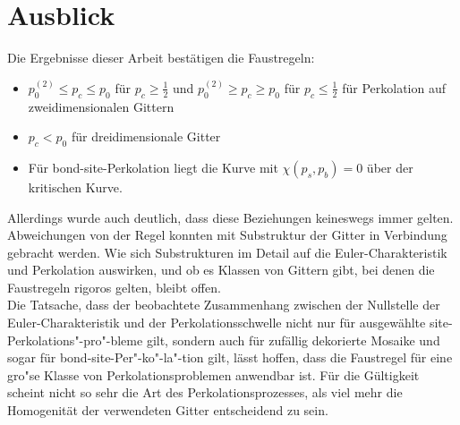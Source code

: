 \section*{Ausblick}
Die Ergebnisse dieser Arbeit best\"atigen die Faustregeln:
\begin{itemize}
\item  $p_0^{(2)}\leq p_c \leq p_0$ f\"ur $p_c\geq \frac{1}{2}$ und $p_0^{(2)}\geq p_c \geq p_0$ f\"ur $p_c\leq \frac{1}{2}$ f\"ur Perkolation auf zweidimensionalen Gittern 
\item $p_c<p_0$ f\"ur dreidimensionale Gitter
\item F\"ur bond-site-Perkolation liegt die Kurve mit $\chi(p_s,p_b)=0$ \"uber der kritischen Kurve.
\end{itemize}
Allerdings wurde auch deutlich, dass diese Beziehungen keineswegs immer gelten. Abweichungen von der Regel konnten mit Substruktur der Gitter in Verbindung gebracht werden. Wie sich Substrukturen im Detail auf die Euler-Charakteristik und Perkolation auswirken, und ob es Klassen von Gittern gibt, bei denen die Faustregeln rigoros gelten, bleibt offen.
\\

Die Tatsache, dass der beobachtete Zusammenhang zwischen der Nullstelle der Euler-Charakteristik und der Perkolationsschwelle nicht nur f\"ur ausgew\"ahlte site-Perkolations"-pro"-bleme gilt, sondern auch f\"ur zuf\"allig dekorierte Mosaike und sogar f\"ur bond-site-Per"-ko"-la"-tion gilt, l\"asst hoffen, dass die Faustregel f\"ur eine gro"se Klasse von Perkolationsproblemen anwendbar ist. F\"ur die G\"ultigkeit scheint nicht so sehr die Art des Perkolationsprozesses, als viel mehr die Homogenit\"at der verwendeten Gitter entscheidend zu sein.